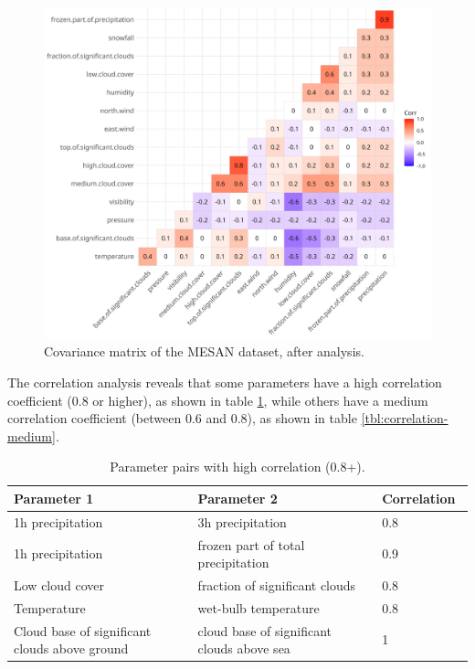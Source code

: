 \begin{figure}[H]
	\centering
	\includegraphics[width=\textwidth, keepaspectratio]{figures/mesan-covariance-matrix-after-analysis}
	\caption{Covariance matrix of the MESAN dataset, after analysis.}
	\label{fig:mesan-covariance-matrix-after-analysis}
\end{figure}

\newpage
The correlation analysis reveals that some parameters have a high correlation coefficient (0.8 or higher), as shown in table \ref{tbl:correlation-high}, while others have a medium correlation coefficient (between 0.6 and 0.8), as shown in table \ref{tbl:correlation-medium}.

\begin{table}[H]
	\centering
	\begin{tabular}{| p{0.4\linewidth} | p{0.4\linewidth} | p{0.2\linewidth} |}
		\hline
		\textbf{Parameter 1} & \textbf{Parameter 2} & \textbf{Correlation} \\
		\hline \hline
		1h precipitation & 3h precipitation & 0.8 \\
		\hline
		1h precipitation & frozen part of total precipitation & 0.9 \\
		\hline
		Low cloud cover & fraction of significant clouds & 0.8 \\
		\hline
		Temperature & wet-bulb temperature & 0.8 \\
		\hline
		Cloud base of significant clouds above ground & cloud base of significant clouds above sea & 1 \\
		\hline
	\end{tabular}
	\caption{Parameter pairs with high correlation (0.8+).}
	\label{tbl:correlation-high}
\end{table}

